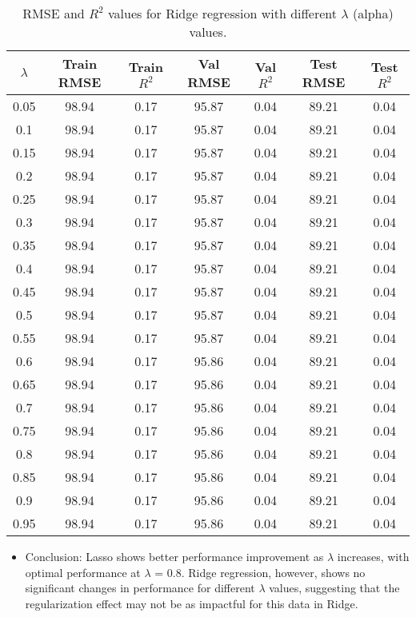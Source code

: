 \documentclass[10pt,letterpaper]{article}
\begin{document}
\begin{itemize}
        \begin{table}[H]
        \centering
        \begin{tabular}{ccccccc}
        \toprule
        \(\lambda\) & \textbf{Train RMSE} & \textbf{Train \(R^2\)} & \textbf{Val RMSE} & \textbf{Val \(R^2\)} & \textbf{Test RMSE} & \textbf{Test \(R^2\)} \\
        \midrule
        0.05 & 98.94  & 0.17  & 95.87 & 0.04 & 89.21 & 0.04 \\
        0.1  & 98.94  & 0.17  & 95.87 & 0.04 & 89.21 & 0.04 \\
        0.15 & 98.94  & 0.17  & 95.87 & 0.04 & 89.21 & 0.04 \\
        0.2  & 98.94  & 0.17  & 95.87 & 0.04 & 89.21 & 0.04 \\
        0.25 & 98.94  & 0.17  & 95.87 & 0.04 & 89.21 & 0.04 \\
        0.3  & 98.94  & 0.17  & 95.87 & 0.04 & 89.21 & 0.04 \\
        0.35 & 98.94  & 0.17  & 95.87 & 0.04 & 89.21 & 0.04 \\
        0.4  & 98.94  & 0.17  & 95.87 & 0.04 & 89.21 & 0.04 \\
        0.45 & 98.94  & 0.17  & 95.87 & 0.04 & 89.21 & 0.04 \\
        0.5  & 98.94  & 0.17  & 95.87 & 0.04 & 89.21 & 0.04 \\
        0.55 & 98.94  & 0.17  & 95.87 & 0.04 & 89.21 & 0.04 \\
        0.6  & 98.94  & 0.17  & 95.86 & 0.04 & 89.21 & 0.04 \\
        0.65 & 98.94  & 0.17  & 95.86 & 0.04 & 89.21 & 0.04 \\
        0.7  & 98.94  & 0.17  & 95.86 & 0.04 & 89.21 & 0.04 \\
        0.75 & 98.94  & 0.17  & 95.86 & 0.04 & 89.21 & 0.04 \\
        0.8  & 98.94  & 0.17  & 95.86 & 0.04 & 89.21 & 0.04 \\
        0.85 & 98.94  & 0.17  & 95.86 & 0.04 & 89.21 & 0.04 \\
        0.9  & 98.94  & 0.17  & 95.86 & 0.04 & 89.21 & 0.04 \\
        0.95 & 98.94  & 0.17  & 95.86 & 0.04 & 89.21 & 0.04 \\
        \bottomrule
        \end{tabular}
        \caption{RMSE and \(R^2\) values for Ridge regression with different \(\lambda\) (alpha) values.}
        \label{tab:ridge_results}
        \end{table}
        \begin{itemize}
            \item Conclusion: Lasso shows better performance improvement as 
            $\lambda$ increases, with optimal performance at 
            $\lambda$ = 0.8. Ridge regression, however, shows no significant changes in performance for different 
            $\lambda$ values, suggesting that the regularization effect may not be as impactful for this data in Ridge.
            

\end{itemize}
\end{itemize}
\end{document}
